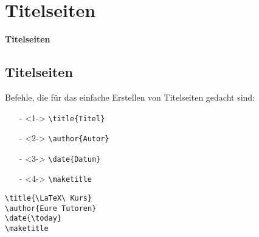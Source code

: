 \documentclass["WS\space 16-17\space -\space LaTeX-Kurs\space -\space Praesentation\space -\space 3.tex"]{subfiles}
\begin{document}
\section{Titelseiten}
\begin{frame}[c]
	\begin{center}
		\LARGE \textbf{Titelseiten}
	\end{center}
\end{frame}
\subsection*{Titelseiten}
\begin{frame}[fragile]
	Befehle, die für das einfache Erstellen von Titelseiten gedacht sind:
	\begin{itemize}
		\item[-]<1->
			\lstinline|\title{Titel}|
		\item[-]<2->
			\lstinline|\author{Autor}|
		\item[-]<3->
			\lstinline|\date{Datum}|
		\item[-]<4->
			\lstinline|\maketitle|
	\end{itemize}

	\Code
	\begin{lstlisting}
\title{\LaTeX\ Kurs}
\author{Eure Tutoren}
\date{\today}
\maketitle
	\end{lstlisting}
\end{frame}
\end{document}

